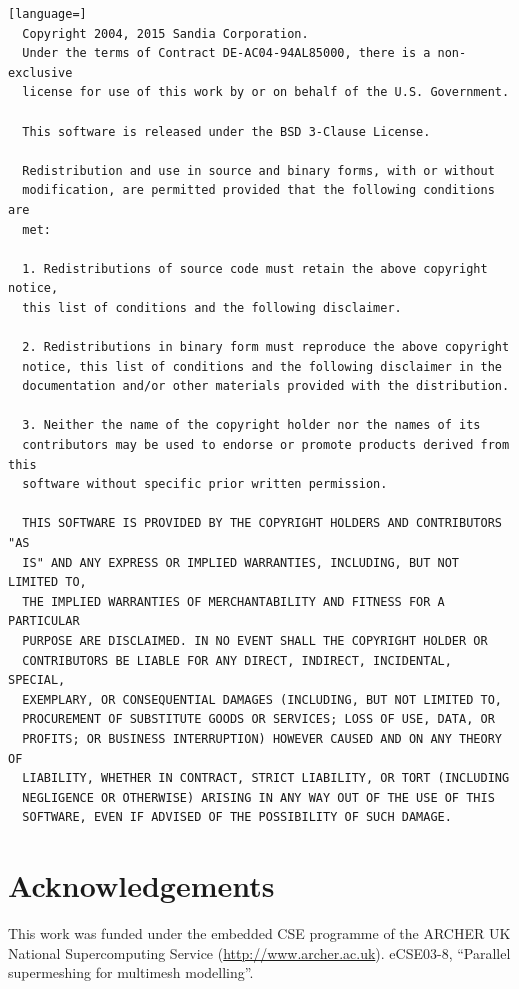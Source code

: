 \documentclass{article}
\begin{document}
\begin{lstlisting}[language=] 
  Copyright 2004, 2015 Sandia Corporation.
  Under the terms of Contract DE-AC04-94AL85000, there is a non-exclusive
  license for use of this work by or on behalf of the U.S. Government.
 
  This software is released under the BSD 3-Clause License.
 
  Redistribution and use in source and binary forms, with or without
  modification, are permitted provided that the following conditions are
  met:
 
  1. Redistributions of source code must retain the above copyright notice,
  this list of conditions and the following disclaimer.
 
  2. Redistributions in binary form must reproduce the above copyright
  notice, this list of conditions and the following disclaimer in the
  documentation and/or other materials provided with the distribution.
 
  3. Neither the name of the copyright holder nor the names of its
  contributors may be used to endorse or promote products derived from this
  software without specific prior written permission.
 
  THIS SOFTWARE IS PROVIDED BY THE COPYRIGHT HOLDERS AND CONTRIBUTORS "AS
  IS" AND ANY EXPRESS OR IMPLIED WARRANTIES, INCLUDING, BUT NOT LIMITED TO,
  THE IMPLIED WARRANTIES OF MERCHANTABILITY AND FITNESS FOR A PARTICULAR
  PURPOSE ARE DISCLAIMED. IN NO EVENT SHALL THE COPYRIGHT HOLDER OR
  CONTRIBUTORS BE LIABLE FOR ANY DIRECT, INDIRECT, INCIDENTAL, SPECIAL,
  EXEMPLARY, OR CONSEQUENTIAL DAMAGES (INCLUDING, BUT NOT LIMITED TO,
  PROCUREMENT OF SUBSTITUTE GOODS OR SERVICES; LOSS OF USE, DATA, OR
  PROFITS; OR BUSINESS INTERRUPTION) HOWEVER CAUSED AND ON ANY THEORY OF
  LIABILITY, WHETHER IN CONTRACT, STRICT LIABILITY, OR TORT (INCLUDING
  NEGLIGENCE OR OTHERWISE) ARISING IN ANY WAY OUT OF THE USE OF THIS
  SOFTWARE, EVEN IF ADVISED OF THE POSSIBILITY OF SUCH DAMAGE.
\end{lstlisting}

\section{Acknowledgements}

This work was funded under the embedded CSE programme of the ARCHER UK National
Supercomputing Service (\url{http://www.archer.ac.uk}). eCSE03-8,
``Parallel supermeshing for multimesh modelling''.
\end{document}
